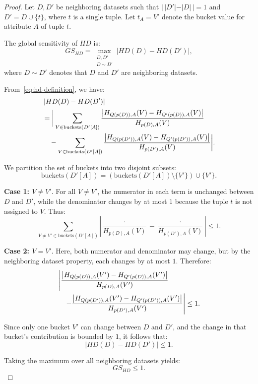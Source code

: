 \begin{proof}
Let $D, D'$ be neighboring datasets such that $|\,|D'| - |D|\,| = 1$ and $D' = D \cup \{t\}$,  
where $t$ is a single tuple.  
Let $t_A = V'$ denote the bucket value for attribute $A$ of tuple $t$.

The global sensitivity of $HD$ is:
\begin{equation}
GS_{HD} = \max_{\substack{D,D' \\ D \sim D'}} 
\left| HD(D) - HD(D') \right|,
\end{equation}
where $D \sim D'$ denotes that $D$ and $D'$ are neighboring datasets.

From~\eqref{eq:hd-definition}, we have:
\begin{align}
&\left| HD(D) - HD(D') \right| \notag \\
&= \bigg| 
\sum_{V \in \text{buckets}(D'[A])} 
\frac{\left| H_{Q(p(D)),A}(V) - H_{Q'(p(D)),A}(V) \right|}
     {H_{p(D),A}(V)} \notag \\
&\quad - 
\sum_{V \in \text{buckets}(D'[A])} 
\frac{\left| H_{Q(p(D')),A}(V) - H_{Q'(p(D')),A}(V) \right|}
     {H_{p(D'),A}(V)}
\bigg|.
\end{align}

We partition the set of buckets into two disjoint subsets:
\[
\text{buckets}(D'[A]) = 
\left(\text{buckets}(D'[A]) \setminus \{V'\}\right) \cup \{V'\}.
\]

\textbf{Case 1: $V \neq V'$}.  
For all $V \neq V'$, the numerator in each term is unchanged between $D$ and $D'$,  
while the denominator changes by at most $1$ because the tuple $t$ is not assigned to $V$.  
Thus:
\[
\sum_{V\ne V' \in \text{buckets}(D'[A])} \left| 
\frac{\cdot}{H_{p(D),A}(V)} - \frac{\cdot}{H_{p(D'),A}(V)}
\right| \leq 1.
\]

\textbf{Case 2: $V = V'$}.  
Here, both numerator and denominator may change, but by the neighboring dataset property,  
each changes by at most $1$. Therefore:
\begin{align}
&\left| 
\frac{\left| H_{Q(p(D)),A}(V') - H_{Q'(p(D)),A}(V') \right|}{H_{p(D),A}(V')}
\right. \notag \\
&\quad \left.
-
\frac{\left| H_{Q(p(D')),A}(V') - H_{Q'(p(D')),A}(V') \right|}{H_{p(D'),A}(V')}
\right| \leq 1.
\end{align}



Since only one bucket $V'$ can change between $D$ and $D'$,  
and the change in that bucket’s contribution is bounded by $1$,  
it follows that:
\[
\left| HD(D) - HD(D') \right| \leq 1.
\]

Taking the maximum over all neighboring datasets yields:
\[
GS_{HD} \leq 1.
\]
\end{proof}


